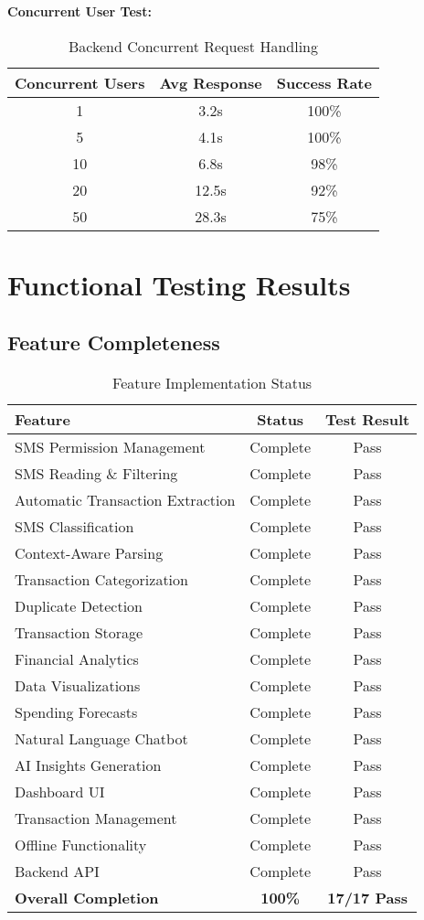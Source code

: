 \documentclass[11pt,a4paper]{report}
\begin{document}
\begin{itemize}
\begin{itemize}
\textbf{Concurrent User Test:}
\begin{table}[H]
\centering
\caption{Backend Concurrent Request Handling}
\begin{tabular}{|c|c|c|}
\hline
\textbf{Concurrent Users} & \textbf{Avg Response} & \textbf{Success Rate} \\
\hline
1 & 3.2s & 100\% \\
5 & 4.1s & 100\% \\
10 & 6.8s & 98\% \\
20 & 12.5s & 92\% \\
50 & 28.3s & 75\% \\
\hline
\end{tabular}
\end{table}

\section{Functional Testing Results}

\subsection{Feature Completeness}

\begin{table}[H]
\centering
\caption{Feature Implementation Status}
\begin{tabular}{|l|c|c|}
\hline
\textbf{Feature} & \textbf{Status} & \textbf{Test Result} \\
\hline
SMS Permission Management & Complete & Pass \\
SMS Reading \& Filtering & Complete & Pass \\
Automatic Transaction Extraction & Complete & Pass \\
SMS Classification & Complete & Pass \\
Context-Aware Parsing & Complete & Pass \\
Transaction Categorization & Complete & Pass \\
Duplicate Detection & Complete & Pass \\
Transaction Storage & Complete & Pass \\
Financial Analytics & Complete & Pass \\
Data Visualizations & Complete & Pass \\
Spending Forecasts & Complete & Pass \\
Natural Language Chatbot & Complete & Pass \\
AI Insights Generation & Complete & Pass \\
Dashboard UI & Complete & Pass \\
Transaction Management & Complete & Pass \\
Offline Functionality & Complete & Pass \\
Backend API & Complete & Pass \\
\hline
\textbf{Overall Completion} & \textbf{100\%} & \textbf{17/17 Pass} \\
\hline
\end{tabular}
\end{table}


\end{itemize}
\end{itemize}
\end{document}
